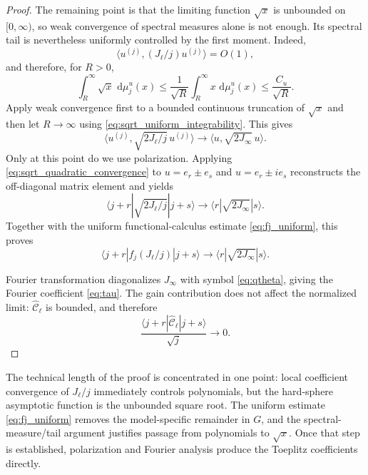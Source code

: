 \documentclass[11pt]{article}
\numberwithin{equation}{section}
\newcommand{\dd}{\,\mathrm d}
\theoremstyle{definition}
\begin{document}
\begin{proof}
The remaining point is that the limiting function $\sqrt{x}$ is unbounded on
$[0,\infty)$, so weak convergence of spectral measures alone is not enough.
Its spectral tail is nevertheless uniformly controlled by the first moment.
Indeed,
\begin{equation}
 \langle u^{(j)},(J_\ell/j)u^{(j)}\rangle=O(1),
\end{equation}
and therefore, for $R>0$,
\begin{equation}
 \int_R^\infty\sqrt{x}\,\dd\mu_j^u(x)
 \le
 \frac1{\sqrt R}\int_R^\infty x\,\dd\mu_j^u(x)
 \le\frac{C_u}{\sqrt R}.
 \label{eq:sqrt_uniform_integrability}
\end{equation}
Apply weak convergence first to a bounded continuous truncation of
$\sqrt{x}$ and then let $R\to\infty$ using
\eqref{eq:sqrt_uniform_integrability}.  This gives
\begin{equation}
 \langle u^{(j)},\sqrt{2J_\ell/j}\,u^{(j)}\rangle
 \longrightarrow
 \langle u,\sqrt{2J_\infty}\,u\rangle.
 \label{eq:sqrt_quadratic_convergence}
\end{equation}
Only at this point do we use polarization.  Applying
\eqref{eq:sqrt_quadratic_convergence} to
$u=e_r\pm e_s$ and $u=e_r\pm i e_s$ reconstructs the off-diagonal matrix
element and yields
\begin{equation}
 \langle j+r|\sqrt{2J_\ell/j}|j+s\rangle
 \longrightarrow
 \langle r|\sqrt{2J_\infty}|s\rangle.
\end{equation}
Together with the uniform functional-calculus estimate
\eqref{eq:fj_uniform}, this proves
\begin{equation}
 \langle j+r|f_j(J_\ell/j)|j+s\rangle
 \longrightarrow
 \langle r|\sqrt{2J_\infty}|s\rangle.
\end{equation}

Fourier transformation diagonalizes $J_\infty$ with symbol
\eqref{eq:qtheta}, giving the Fourier coefficient
\eqref{eq:tau}.  The gain contribution does not affect the normalized limit:
$\widehat{\mathcal C}_\ell$ is bounded, and therefore
\begin{equation}
 \frac{
 \langle j+r|\widehat{\mathcal C}_\ell|j+s\rangle
 }{\sqrt j}
 \to0.
\end{equation}
\end{proof}
The technical length of the proof is concentrated in one point: local
coefficient convergence of $J_\ell/j$ immediately controls polynomials, but the
hard-sphere asymptotic function is the unbounded square root.  The uniform
estimate \eqref{eq:fj_uniform} removes the model-specific remainder in $G$, and
the spectral-measure/tail argument justifies passage from polynomials to
$\sqrt{x}$.  Once that step is established, polarization and Fourier analysis
produce the Toeplitz coefficients directly.
\end{document}
